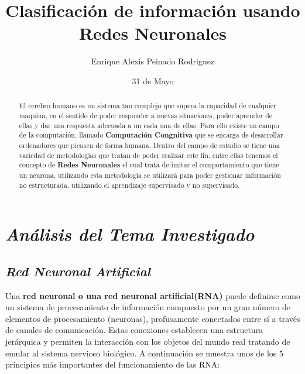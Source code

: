 \documentclass[journal]{IEEEtran}
\title{Clasificación de información usando Redes Neuronales}
\author{Enrique Alexis Peinado Rodriguez}
\date{31 de Mayo}
\begin{document}
\maketitle
\begin{abstract}

El cerebro humano es un sistema tan complejo que supera la capacidad de cualquier maquina, en el sentido de poder responder a nuevas situaciones, poder aprender de ellas y dar una respuesta adecuada a un cada una de ellas. Para ello existe un campo de la computación, llamado \textbf{Computación Congnitiva} que se encarga de desarrollar ordenadores que piensen de forma humana. Dentro del campo de estudio se tiene una variedad de metodologías que tratan de poder realizar este fin, entre ellas tenemos el concepto de \textbf{Redes Neuronales} el cual trata de imitar el comportamiento que tiene un neurona, utilizando esta metodología se utilizará para poder gestionar información no estructurada, utilizando el aprendizaje supervisado y no supervisado.
\end{abstract}

\section{\textbf{\emph{Análisis del Tema Investigado}}}

\subsection{\textbf{\emph{Red Neuronal Artificial}}}

Una \textbf{red neuronal o una red neuronal artificial(RNA)} puede definirse como un sistema de procesamiento de información compuesto por un gran número de elementos de procesamiento (neuronas), profusamente conectados entre sí a través de canales de comunicación. Estas conexiones establecen una estructura jerárquica y permiten la interacción con los objetos del mundo real tratando de emular al sistema nervioso biológico. A continuación se muestra unos de los 5 principios más importantes del funcionamiento de las RNA:\\
\end{document}
